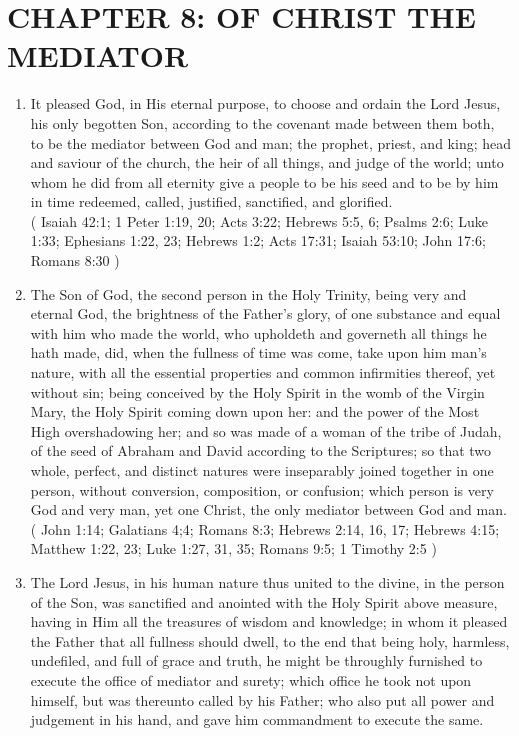 \documentclass[12pt,a4paper]{book}
\begin{document}
\chapter{CHAPTER 8: OF CHRIST THE MEDIATOR}
\label{ch-med}
\begin{enumerate}
\item It pleased God, in His eternal purpose, to choose and ordain the Lord Jesus, his only begotten Son, according to the covenant made between them both, to be the mediator between God and man; the prophet, priest, and king; head and saviour of the church, the heir of all things, and judge of the world; unto whom he did from all eternity give a people to be his seed and to be by him in time redeemed, called, justified, sanctified, and glorified.\\
( Isaiah 42:1; 1 Peter 1:19, 20; Acts 3:22; Hebrews 5:5, 6; Psalms 2:6; Luke 1:33; Ephesians 1:22, 23; Hebrews 1:2; Acts 17:31; Isaiah 53:10; John 17:6; Romans 8:30 )
\item The Son of God, the second person in the Holy Trinity, being very and eternal God, the brightness of the Father's glory, of one substance and equal with him who made the world, who upholdeth and governeth all things he hath made, did, when the fullness of time was come, take upon him man's nature, with all the essential properties and common infirmities thereof, yet without sin; being conceived by the Holy Spirit in the womb of the Virgin Mary, the Holy Spirit coming down upon her: and the power of the Most High overshadowing her; and so was made of a woman of the tribe of Judah, of the seed of Abraham and David according to the Scriptures; so that two whole, perfect, and distinct natures were inseparably joined together in one person, without conversion, composition, or confusion; which person is very God and very man, yet one Christ, the only mediator between God and man.\\
( John 1:14; Galatians 4;4; Romans 8:3; Hebrews 2:14, 16, 17; Hebrews 4:15; Matthew 1:22, 23; Luke 1:27, 31, 35; Romans 9:5; 1 Timothy 2:5 )
\item The Lord Jesus, in his human nature thus united to the divine, in the person of the Son, was sanctified and anointed with the Holy Spirit above measure, having in Him all the treasures of wisdom and knowledge; in whom it pleased the Father that all fullness should dwell, to the end that being holy, harmless, undefiled, and full of grace and truth, he might be throughly furnished to execute the office of mediator and surety; which office he took not upon himself, but was thereunto called by his Father; who also put all power and judgement in his hand, and gave him commandment to execute the same.\\

\end{enumerate}
\end{document}
